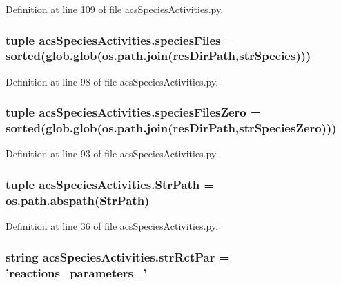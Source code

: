 Definition at line 109 of file acs\-Species\-Activities.\-py.

\hypertarget{a00103_a7e3b3a6b0c9305e60758bf5d44e7b0f6}{
\subsubsection[{species\-Files}]{\setlength{\rightskip}{0pt plus 5cm}tuple acs\-Species\-Activities.\-species\-Files = sorted(glob.\-glob(os.\-path.\-join({\bf res\-Dir\-Path},{\bf str\-Species})))}}\label{a00103_a7e3b3a6b0c9305e60758bf5d44e7b0f6}


Definition at line 98 of file acs\-Species\-Activities.\-py.

\hypertarget{a00103_a2f73b228eca2d5d0e45f781ccc21b253}{
\subsubsection[{species\-Files\-Zero}]{\setlength{\rightskip}{0pt plus 5cm}tuple acs\-Species\-Activities.\-species\-Files\-Zero = sorted(glob.\-glob(os.\-path.\-join({\bf res\-Dir\-Path},{\bf str\-Species\-Zero})))}}\label{a00103_a2f73b228eca2d5d0e45f781ccc21b253}


Definition at line 93 of file acs\-Species\-Activities.\-py.

\hypertarget{a00103_a05f0f829ce4df27678aa19d4e5f10c54}{
\subsubsection[{Str\-Path}]{\setlength{\rightskip}{0pt plus 5cm}tuple acs\-Species\-Activities.\-Str\-Path = os.\-path.\-abspath(Str\-Path)}}\label{a00103_a05f0f829ce4df27678aa19d4e5f10c54}


Definition at line 36 of file acs\-Species\-Activities.\-py.

\hypertarget{a00103_ab59af27efe5462ef13ae45fd7330d0b3}{
\subsubsection[{str\-Rct\-Par}]{\setlength{\rightskip}{0pt plus 5cm}string acs\-Species\-Activities.\-str\-Rct\-Par = 'reactions\-\_\-parameters\-\_\-'}}\label{a00103_ab59af27efe5462ef13ae45fd7330d0b3}


